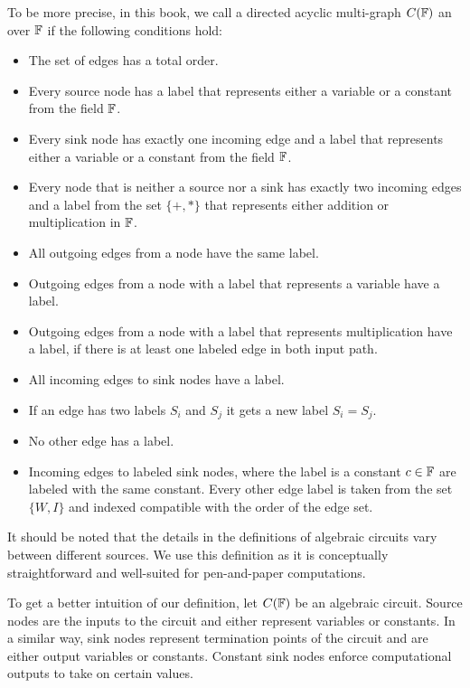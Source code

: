 To be more precise, in this book, we call a directed acyclic multi-graph $C(\mathbb{F})$  an  over $\mathbb{F}$ if the following conditions hold:

\begin{itemize}
\label{def:algebraic-circuit}
\item The set of edges has a total order.  
\item Every source node has a label that represents either a variable or a constant from the field $\mathbb{F}$.
\item Every sink node has exactly one incoming edge and a label that represents either a variable or a constant from the field $\mathbb{F}$.
\item Every node that is neither a source nor a sink has exactly two incoming edges and a label from the set $\{+,*\}$ that represents either addition or multiplication in $\mathbb{F}$.
\item All outgoing edges from a node have the same label.
\item Outgoing edges from a node with a label that represents a variable have a label.
\item Outgoing edges from a node with a label that represents multiplication have a label, if there is at least one labeled edge in both input path.
\item All incoming edges to sink nodes have a label.
\item If an edge has two labels $S_i$ and $S_j$ it gets a new label $S_i = S_j$.
\item No other edge has a label.
\item Incoming edges to labeled sink nodes, where the label is a constant $c\in\mathbb{F}$ are labeled with the same constant. Every other edge label is taken from the set $\{W,I\}$ and indexed compatible with the order of the edge set. 
\end{itemize} 

It should be noted that the details in the definitions of algebraic circuits vary between different sources. We use this definition as it is conceptually straightforward and well-suited for pen-and-paper computations.

To get a better intuition of our definition, let $C(\mathbb{F})$ be an algebraic circuit. Source nodes are the inputs to the circuit and either represent variables or constants. In a similar way, sink nodes represent termination points of the circuit and are either output variables or constants. Constant sink nodes enforce computational outputs to take on certain values.  

